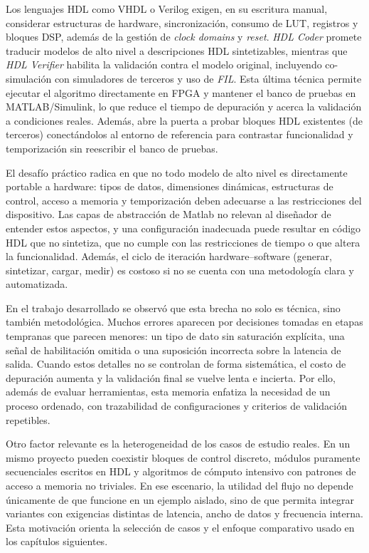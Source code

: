 Los lenguajes HDL como VHDL o Verilog exigen, en su escritura manual, considerar estructuras de hardware, sincronización, consumo de LUT, registros y bloques DSP, además de la gestión de \textit{clock domains} y \textit{reset}. \textit{HDL Coder} promete traducir modelos de alto nivel a descripciones HDL sintetizables, mientras que \textit{HDL Verifier} habilita la validación contra el modelo original, incluyendo co-simulación con simuladores de terceros y uso de \textit{FIL}. Esta última técnica permite ejecutar el algoritmo directamente en FPGA y mantener el banco de pruebas en MATLAB/Simulink, lo que reduce el tiempo de depuración y acerca la validación a condiciones reales. Además, abre la puerta a probar bloques HDL existentes (de terceros) conectándolos al entorno de referencia para contrastar funcionalidad y temporización sin reescribir el banco de pruebas.

El desafío práctico radica en que no todo modelo de alto nivel es directamente portable a hardware: tipos de datos, dimensiones dinámicas, estructuras de control, acceso a memoria y temporización deben adecuarse a las restricciones del dispositivo. Las capas de abstracción de Matlab no relevan al diseñador de entender estos aspectos, y una configuración inadecuada puede resultar en código HDL que no sintetiza, que no cumple con las restricciones de tiempo o que altera la funcionalidad. Además, el ciclo de iteración hardware--software (generar, sintetizar, cargar, medir) es costoso si no se cuenta con una metodología clara y automatizada.

En el trabajo desarrollado se observó que esta brecha no solo es técnica, sino también metodológica. Muchos errores aparecen por decisiones tomadas en etapas tempranas que parecen menores: un tipo de dato sin saturación explícita, una señal de habilitación omitida o una suposición incorrecta sobre la latencia de salida. Cuando estos detalles no se controlan de forma sistemática, el costo de depuración aumenta y la validación final se vuelve lenta e incierta. Por ello, además de evaluar herramientas, esta memoria enfatiza la necesidad de un proceso ordenado, con trazabilidad de configuraciones y criterios de validación repetibles.

Otro factor relevante es la heterogeneidad de los casos de estudio reales. En un mismo proyecto pueden coexistir bloques de control discreto, módulos puramente secuenciales escritos en HDL y algoritmos de cómputo intensivo con patrones de acceso a memoria no triviales. En ese escenario, la utilidad del flujo no depende únicamente de que funcione en un ejemplo aislado, sino de que permita integrar variantes con exigencias distintas de latencia, ancho de datos y frecuencia interna. Esta motivación orienta la selección de casos y el enfoque comparativo usado en los capítulos siguientes.

